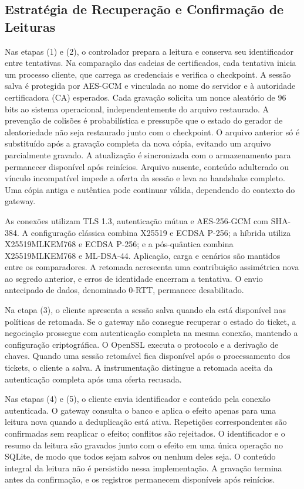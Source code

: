 \subsection{Estratégia de Recuperação e Confirmação de Leituras}

Nas etapas (1) e (2), o controlador prepara a leitura e conserva seu identificador entre tentativas. Na comparação das cadeias de certificados, cada tentativa inicia um processo cliente, que carrega as credenciais e verifica o checkpoint. A sessão salva é protegida por AES-GCM e vinculada ao nome do servidor e à autoridade certificadora (CA) esperados. Cada gravação solicita um nonce aleatório de 96 bits ao sistema operacional, independentemente do arquivo restaurado. A prevenção de colisões é probabilística e pressupõe que o estado do gerador de aleatoriedade não seja restaurado junto com o checkpoint. O arquivo anterior só é substituído após a gravação completa da nova cópia, evitando um arquivo parcialmente gravado. A atualização é sincronizada com o armazenamento para permanecer disponível após reinícios. Arquivo ausente, conteúdo adulterado ou vínculo incompatível impede a oferta da sessão e leva ao handshake completo. Uma cópia antiga e autêntica pode continuar válida, dependendo do contexto do gateway.

As conexões utilizam TLS 1.3, autenticação mútua e AES-256-GCM com SHA-384. A configuração clássica combina X25519 e ECDSA P-256; a híbrida utiliza X25519MLKEM768 e ECDSA P-256; e a pós-quântica combina X25519MLKEM768 e ML-DSA-44. Aplicação, carga e cenários são mantidos entre os comparadores. A retomada acrescenta uma contribuição assimétrica nova ao segredo anterior, e erros de identidade encerram a tentativa. O envio antecipado de dados, denominado 0-RTT, permanece desabilitado.

Na etapa (3), o cliente apresenta a sessão salva quando ela está disponível nas políticas de retomada. Se o gateway não consegue recuperar o estado do ticket, a negociação prossegue com autenticação completa na mesma conexão, mantendo a configuração criptográfica. O OpenSSL executa o protocolo e a derivação de chaves. Quando uma sessão retomável fica disponível após o processamento dos tickets, o cliente a salva. A instrumentação distingue a retomada aceita da autenticação completa após uma oferta recusada.

Nas etapas (4) e (5), o cliente envia identificador e conteúdo pela conexão autenticada. O gateway consulta o banco e aplica o efeito apenas para uma leitura nova quando a deduplicação está ativa. Repetições correspondentes são confirmadas sem reaplicar o efeito; conflitos são rejeitados. O identificador e o resumo da leitura são gravados junto com o efeito em uma única operação no SQLite, de modo que todos sejam salvos ou nenhum deles seja. O conteúdo integral da leitura não é persistido nessa implementação. A gravação termina antes da confirmação, e os registros permanecem disponíveis após reinícios.

